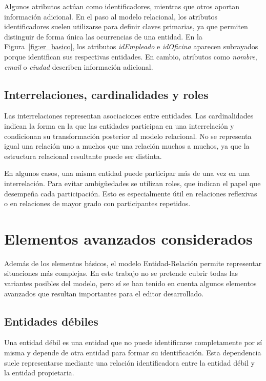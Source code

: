 Algunos atributos actúan como identificadores, mientras que otros aportan información adicional. En el paso al modelo relacional, los atributos identificadores suelen utilizarse para definir claves primarias, ya que permiten distinguir de forma única las ocurrencias de una entidad. En la Figura~\ref{fig:er_basico}, los atributos \textit{idEmpleado} e \textit{idOficina} aparecen subrayados porque identifican sus respectivas entidades. En cambio, atributos como \textit{nombre}, \textit{email} o \textit{ciudad} describen información adicional.

\subsection{Interrelaciones, cardinalidades y roles}

Las interrelaciones representan asociaciones entre entidades. Las cardinalidades indican la forma en la que las entidades participan en una interrelación y condicionan su transformación posterior al modelo relacional. No se representa igual una relación uno a muchos que una relación muchos a muchos, ya que la estructura relacional resultante puede ser distinta.

En algunos casos, una misma entidad puede participar más de una vez en una interrelación. Para evitar ambigüedades se utilizan roles, que indican el papel que desempeña cada participación. Esto es especialmente útil en relaciones reflexivas o en relaciones de mayor grado con participantes repetidos.

\section{Elementos avanzados considerados}

Además de los elementos básicos, el modelo Entidad-Relación permite representar situaciones más complejas. En este trabajo no se pretende cubrir todas las variantes posibles del modelo, pero sí se han tenido en cuenta algunos elementos avanzados que resultan importantes para el editor desarrollado.

\subsection{Entidades débiles}

Una entidad débil es una entidad que no puede identificarse completamente por sí misma y depende de otra entidad para formar su identificación. Esta dependencia suele representarse mediante una relación identificadora entre la entidad débil y la entidad propietaria.

